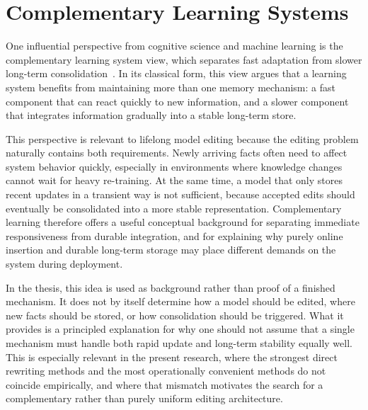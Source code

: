 \section{Complementary Learning Systems}

One influential perspective from cognitive science and machine learning is the complementary learning system view, which separates fast adaptation from slower long-term consolidation~\cite{kumaran2016learning}. In its classical form, this view argues that a learning system benefits from maintaining more than one memory mechanism: a fast component that can react quickly to new information, and a slower component that integrates information gradually into a stable long-term store.

This perspective is relevant to lifelong model editing because the editing problem naturally contains both requirements. Newly arriving facts often need to affect system behavior quickly, especially in environments where knowledge changes cannot wait for heavy re-training. At the same time, a model that only stores recent updates in a transient way is not sufficient, because accepted edits should eventually be consolidated into a more stable representation. Complementary learning therefore offers a useful conceptual background for separating immediate responsiveness from durable integration, and for explaining why purely online insertion and durable long-term storage may place different demands on the system during deployment.

In the thesis, this idea is used as background rather than proof of a finished mechanism. It does not by itself determine how a model should be edited, where new facts should be stored, or how consolidation should be triggered. What it provides is a principled explanation for why one should not assume that a single mechanism must handle both rapid update and long-term stability equally well. This is especially relevant in the present research, where the strongest direct rewriting methods and the most operationally convenient methods do not coincide empirically, and where that mismatch motivates the search for a complementary rather than purely uniform editing architecture.
